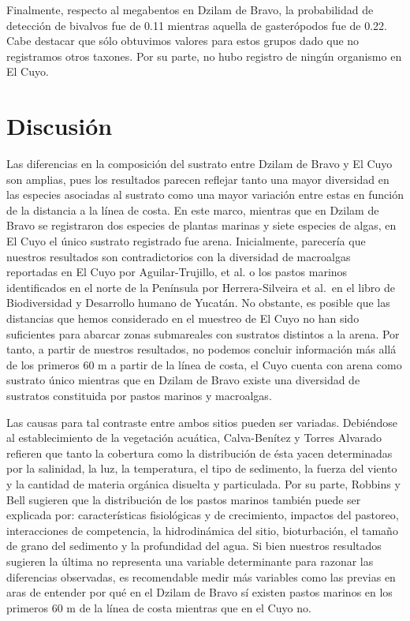\documentclass[
  authoryear,
  preprint,
  3p,
  twocolumn]{elsarticle}
\begin{document}
Finalmente, respecto al megabentos en Dzilam de Bravo, la probabilidad
de detección de bivalvos fue de 0.11 mientras aquella de gasterópodos
fue de 0.22. Cabe destacar que sólo obtuvimos valores para estos grupos
dado que no registramos otros taxones. Por su parte, no hubo registro de
ningún organismo en El Cuyo.

\hypertarget{discusiuxf3n}{%
\section{Discusión}\label{discusiuxf3n}}

Las diferencias en la composición del sustrato entre Dzilam de Bravo y
El Cuyo son amplias, pues los resultados parecen reflejar tanto una
mayor diversidad en las especies asociadas al sustrato como una mayor
variación entre estas en función de la distancia a la línea de costa. En
este marco, mientras que en Dzilam de Bravo se registraron dos especies
de plantas marinas y siete especies de algas, en El Cuyo el único
sustrato registrado fue arena. Inicialmente, parecería que nuestros
resultados son contradictorios con la diversidad de macroalgas
reportadas en El Cuyo por Aguilar-Trujillo, et
al.\citep{aguilar2014variacion} o los pastos marinos identificados en el
norte de la Península por Herrera-Silveira et al.~en el libro de
Biodiversidad y Desarrollo humano de
Yucatán\citep{garcia2010biodiversidad}. No obstante, es posible que las
distancias que hemos considerado en el muestreo de El Cuyo no han sido
suficientes para abarcar zonas submareales con sustratos distintos a la
arena. Por tanto, a partir de nuestros resultados, no podemos concluir
información más allá de los primeros 60 m a partir de la línea de costa,
el Cuyo cuenta con arena como sustrato único mientras que en Dzilam de
Bravo existe una diversidad de sustratos constituida por pastos marinos
y macroalgas.

Las causas para tal contraste entre ambos sitios pueden ser variadas.
Debiéndose al establecimiento de la vegetación acuática, Calva-Benítez y
Torres Alvarado\citep{calva2011carbono} refieren que tanto la cobertura
como la distribución de ésta yacen determinadas por la salinidad, la
luz, la temperatura, el tipo de sedimento, la fuerza del viento y la
cantidad de materia orgánica disuelta y particulada. Por su parte,
Robbins y Bell\citep{robbins2000dynamics} sugieren que la distribución
de los pastos marinos también puede ser explicada por: características
fisiológicas y de crecimiento, impactos del pastoreo, interacciones de
competencia, la hidrodinámica del sitio, bioturbación, el tamaño de
grano del sedimento y la profundidad del agua. Si bien nuestros
resultados sugieren la última no representa una variable determinante
para razonar las diferencias observadas, es recomendable medir más
variables como las previas en aras de entender por qué en el Dzilam de
Bravo sí existen pastos marinos en los primeros 60 m de la línea de
costa mientras que en el Cuyo no.
\end{document}

